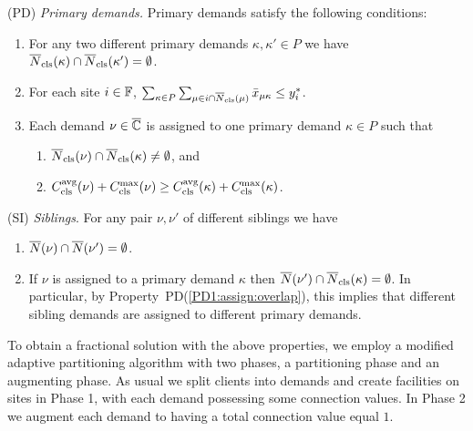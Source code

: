 \documentclass[11pt]{article}
\begin{document}
\begin{description}
\item{(PD)} \emph{Primary demands.}
	Primary demands satisfy the following conditions:

	\begin{enumerate}
		
	\item\label{PD1:disjoint}  For any two different primary demands $\kappa,\kappa'\in P$ we have
				${\overline{N}}_{\text{cls}}(\kappa)\cap {\overline{N}}_{\text{cls}}(\kappa') = \emptyset$.

	\item \label{PD1:yi} For each site $i\in\mathbb{F}$, 
		$ \sum_{\kappa\in P}\sum_{\mu\in i\cap{\overline{N}}_{\text{cls}}(\mu)}{\bar x}_{\mu\kappa} \leq y_i^\ast$.
		
	\item \label{PD1:assign} Each demand $\nu\in\overline{\mathbb{C}}$ is assigned
        to one primary demand $\kappa\in P$ such that

  			\begin{enumerate}
	
				\item \label{PD1:assign:overlap} ${\overline{N}}_{\text{cls}}(\nu) \cap {\overline{N}}_{\text{cls}}(\kappa) \neq \emptyset$, and
				\item \label{PD1:assign:cost}
          $C_{\text{cls}}^{{\mbox{\scriptsize\rm avg}}}(\nu)+C_{\text{cls}}^{\max}(\nu) \geq
          C_{\text{cls}}^{{\mbox{\scriptsize\rm avg}}}(\kappa)+C_{\text{cls}}^{\max}(\kappa)$.
			\end{enumerate}

	\end{enumerate}
	
\item{(SI)} \emph{Siblings}. For any pair $\nu,\nu'$ of different siblings we have
  \begin{enumerate}

	\item \label{SI1:siblings disjoint}
		  ${\overline{N}}(\nu)\cap {\overline{N}}(\nu') = \emptyset$.
		
	\item \label{SI1:primary disjoint} If $\nu$ is assigned to a primary demand $\kappa$ then
 		${\overline{N}}(\nu')\cap {\overline{N}}_{\text{cls}}(\kappa) = \emptyset$. In particular, by Property~PD(\ref{PD1:assign:overlap}),
		this implies that different sibling demands are assigned to different primary demands.

	\end{enumerate}
	
\end{description}

To obtain a fractional solution with the above properties,
we employ a modified adaptive partitioning algorithm with
two phases, a partitioning phase and an augmenting phase. As
usual we split clients into demands and create facilities on
sites in Phase 1, with each demand possessing some
connection values. In Phase 2 we augment each demand to
having a total connection value equal $1$.
\end{document}
